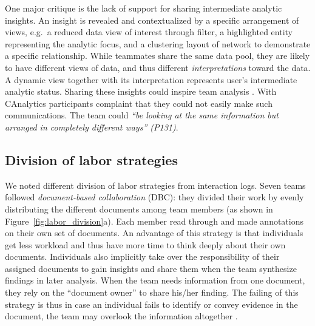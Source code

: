 One major critique is the lack of support for sharing intermediate analytic
insights. An insight is revealed and contextualized by a specific arrangement of views, e.g.~a reduced data view of interest through filter, a highlighted entity representing the analytic focus, and a clustering layout of network to demonstrate a specific relationship. While teammates share the same data pool, they are likely to have different views of data, and thus different \emph{interpretations}
toward the data. A dynamic view together with its interpretation represents
user's intermediate analytic status. Sharing these insights could inspire team analysis \cite{Gotz2009d}. With CAnalytics
participants complaint that they could not easily make such communications. The team could \emph{``be
looking at the same information but arranged in completely different
ways'' (P131)}.

\subsection{Division of labor strategies}\label{labor-division-strategies}

We noted different division of labor strategies from interaction logs. Seven
teams followed \emph{document-based collaboration} (DBC): they divided their
work by evenly distributing the different documents among team members
(as shown in Figure~\ref{fig:labor_division}a). Each member read
through and made annotations on their own set of documents. An advantage
of this strategy is that individuals get less workload and thus have
more time to think deeply about their own documents. Individuals also
implicitly take over the responsibility of their assigned documents to
gain insights and share them when the team synthesize findings in later
analysis. When the team needs information from one document, they rely
on the ``document owner'' to share his/her finding. The failing of this
strategy is thus in case an individual fails to identify or convey
evidence in the document, the team may overlook the information
altogether \cite{Borge2012}.

